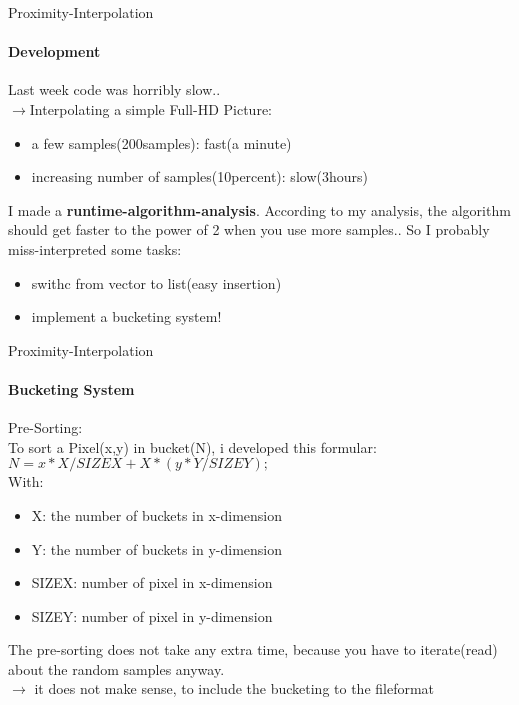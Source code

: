 \begin{frame}{Proximity-Interpolation}
\framesubtitle{Development}
Last week code was horribly slow.. \\
\(\rightarrow\)Interpolating a simple Full-HD Picture:\\
\begin{itemize}
\item a few samples(200samples): fast(a minute)
\item increasing number of samples(10percent): slow(3hours)
\end{itemize}

I made a \textbf{runtime-algorithm-analysis}. According to my analysis, the algorithm should get
faster to the power of 2 when you use more samples.. So I probably miss-interpreted
some tasks:\\
\begin{itemize}
\item swithc from vector to list(easy insertion)
\item implement a bucketing system!
\end{itemize}
\end{frame}

\begin{frame}{Proximity-Interpolation}
\framesubtitle{Bucketing System}
Pre-Sorting:\\
To sort a Pixel(x,y) in bucket(N), i developed this formular:\\
\(N=x*X/SIZEX+X*(y*Y/SIZEY);\)\\
With:\\
\begin{itemize}
\item X: the number of buckets in x-dimension
\item Y: the number of buckets in y-dimension
\item SIZEX: number of pixel in x-dimension
\item SIZEY: number of pixel in y-dimension
\end{itemize}
The pre-sorting does not take any extra time, because you have to iterate(read) about the random
samples anyway.\\ \(\rightarrow\) it does not make sense, to include the bucketing to the fileformat\\
\end{frame}

